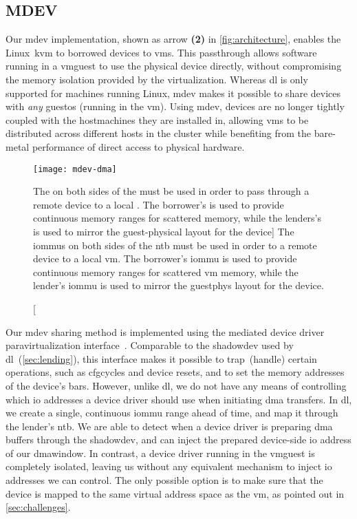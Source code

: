 \subsection{MDEV}\label{sec:mdev}
Our \gls{mdev} implementation, shown as arrow \textbf{(2)} in \cref{fig:architecture}, enables the Linux~\gls{kvm} to \emph{} borrowed devices to \glspl{vm}.
%
This \gls{passthrough} allows software running in a \gls{vmguest} to use the physical device directly, without compromising the memory isolation provided by the virtualization.
%
Whereas \gls{dl} is only supported for machines running Linux, \gls{mdev} makes it possible to share devices with \emph{any} \gls{guestos} (running in the \gls{vm}).
%
Using \gls{mdev}, devices are no longer tightly coupled with the \glspl{hostmachine} they are installed in, allowing \glspl{vm} to be distributed across different \glspl{host} in the cluster while benefiting from the bare-metal performance of direct access to physical hardware.


\begin{figure}
    \centering
    \texttt{[image: mdev-dma]}
    \caption
    [The  on both sides of the  must be used in order to pass through a remote device to a local . The borrower's  is used to provide continuous memory ranges for scattered  memory, while the lenders's  is used to mirror the guest-physical layout for the device]
    {The \glspl{iommu} on both sides of the \gls{ntb} must be used in order to  a remote device to a local \gls{vm}. The \gls{borrower}'s \gls{iommu} is used to provide continuous memory ranges for scattered \gls{vm} memory, while the \gls{lender}'s \gls{iommu} is used to mirror the \gls{guestphys} layout for the device.}
    \label{fig:mdev-dma}
\end{figure}


Our \gls{mdev} sharing method is implemented using the mediated device driver \gls{paravirtualization} interface~\cite{url:LinuxMDEV}.
%
Comparable to the \gls{shadowdev} used by \gls{dl}~(\cref{sec:lending}), this interface makes it possible to \gls{trap}~(handle) certain operations, such as \glspl{cfgcycle} and device resets, and to set the memory addresses of the device's \glspl{bar}.
%
However, unlike \gls{dl}, we do not have any means of controlling which \gls{io} addresses a device driver should use when initiating \gls{dma} transfers.
%
In \gls{dl}, we create a single, continuous \gls{iommu} range ahead of time, and map it through the \gls{lender}'s \gls{ntb}. 
%
We are able to detect when a device driver is preparing \gls{dma} buffers through the \gls{shadowdev}, and can inject the prepared device-side \gls{io} address of our \gls{dmawindow}.
%
In contrast, a device driver running in the \gls{vmguest} is completely isolated, leaving us without any equivalent mechanism to inject \gls{io} addresses we can control.
%
The only possible option is to make sure that the device is mapped to the same virtual address space as the \gls{vm}, as pointed out in \cref{sec:challenges}.



